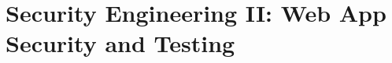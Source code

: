 \documentclass[../main.tex]{subfiles}
\begin{document}
\chapter{Security Engineering II: Web App Security and Testing}
\label{ch:web-app-security-testing}

\end{document}

